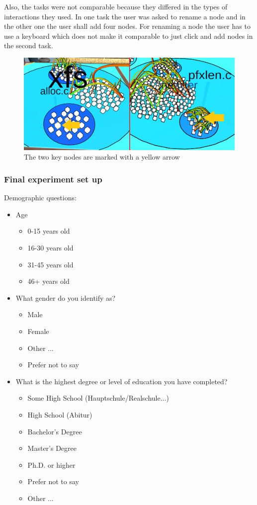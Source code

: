 Also, the tasks were not comparable because they differed in the types of interactions they used.
In one task the user was asked to rename a node and in the other one the user shall add four nodes.
For renaming a node the user has to use a keyboard which does not make it comparable to just click and add nodes in the second task.

\begin{figure}[htb]
    \centering
    \includegraphics[width=1\textwidth]{Evaluation/img/task1.png}
    \caption{The two key nodes are marked with a yellow arrow}\label{fig:task1}
\end{figure}

\subsubsection{Final experiment set up}

Demographic questions:
\begin{itemize}
    \item Age
    \begin{itemize}
        \item 0-15 years old
        \item 16-30 years old
        \item 31-45 years old
        \item 46+ years old
    \end{itemize}
    \item What gender do you identify as?
    \begin{itemize}
        \item Male
        \item Female
        \item Other ...
        \item Prefer not to say
    \end{itemize}
    \item What is the highest degree or level of education you have completed?
    \begin{itemize}
        \item Some High School (Hauptschule/Realschule...)
        \item High School (Abitur)
        \item Bachelor's Degree
        \item Master's Degree
        \item Ph.D. or higher
        \item Prefer not to say
        \item Other ...
    \end{itemize}
\end{itemize}

